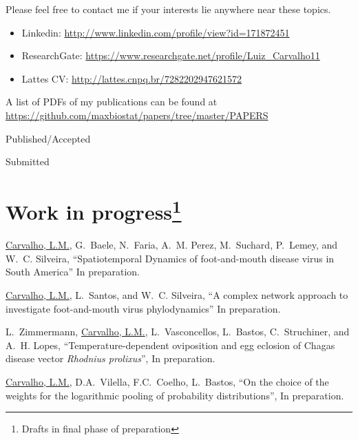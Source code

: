 \documentclass[10pt]{article}
\begin{document}
Please feel free to contact me if your interests lie anywhere near these topics.

\begin{itemize}
\itemsep0.1em
 \item[] Linkedin: \url{http://www.linkedin.com/profile/view?id=171872451}\\
 \item[] ResearchGate: \url{https://www.researchgate.net/profile/Luiz_Carvalho11}\\
 \item[] Lattes CV: \url{ http://lattes.cnpq.br/7282202947621572} 
\end{itemize}

\newpage
A list of PDFs of my publications can be found at \url{https://github.com/maxbiostat/papers/tree/master/PAPERS}
\nocite{*}
\begin{category}{Published/Accepted}
\end{category}
\begin{category}{Submitted}
\SBentries{}
\end{category}


\section*{Work in progress\footnote{Drafts in final phase of preparation}}

\underline{Carvalho, L.M.}, G.~Baele, N.~Faria, A.~M. Perez, M.~Suchard, P.~Lemey, and  W.~C. Silveira, ``{S}patiotemporal {D}ynamics of foot-and-mouth disease virus in {S}outh {A}merica'' In preparation.

\underline{Carvalho, L.M.}, L.~Santos, and W.~C. Silveira, ``A complex network approach to investigate foot-and-mouth virus phylodynamics'' In preparation.

L.~Zimmermann, \underline{Carvalho, L.M.}, L.~Vasconcellos, L.~Bastos, C.~Struchiner, and A.~H. Lopes, ``{T}emperature-dependent oviposition and egg eclosion of {C}hagas disease vector \textit{{R}hodnius prolixus}'', In preparation.

\underline{Carvalho, L.M.}, D.A.~Vilella, F.C.~Coelho, L.~Bastos, ``{O}n the choice of the weights for the logarithmic pooling of probability distributions'', In preparation.
\end{document}
